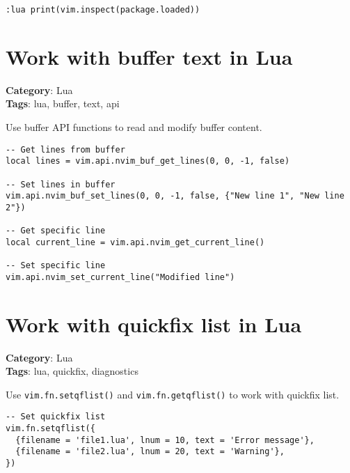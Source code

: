 {{{{{{{\begin{Exa*}{}
\begin{Verbatim}[fontsize=\footnotesize, breaklines, breakanywhere]
:lua print(vim.inspect(package.loaded))
\end{Verbatim}
\end{Exa*}

\section{Work with buffer text in Lua}

\textbf{Category}: Lua\\ \textbf{Tags}: lua, buffer, text, api
\vspace{0.5cm}

Use buffer API functions to read and modify buffer content.

\begin{Exa*}{}
\begin{Verbatim}[fontsize=\footnotesize, breaklines, breakanywhere]
-- Get lines from buffer
local lines = vim.api.nvim_buf_get_lines(0, 0, -1, false)

-- Set lines in buffer
vim.api.nvim_buf_set_lines(0, 0, -1, false, {"New line 1", "New line 2"})

-- Get specific line
local current_line = vim.api.nvim_get_current_line()

-- Set specific line
vim.api.nvim_set_current_line("Modified line")
\end{Verbatim}
\end{Exa*}

\section{Work with quickfix list in Lua}

\textbf{Category}: Lua\\ \textbf{Tags}: lua, quickfix, diagnostics
\vspace{0.5cm}

Use {\footnotesize \Verb§vim.fn.setqflist()§} and {\footnotesize \Verb§vim.fn.getqflist()§} to work with quickfix list.

\begin{Exa*}{}
\begin{Verbatim}[fontsize=\footnotesize, breaklines, breakanywhere]
-- Set quickfix list
vim.fn.setqflist({
  {filename = 'file1.lua', lnum = 10, text = 'Error message'},
  {filename = 'file2.lua', lnum = 20, text = 'Warning'},
})


\end{Verbatim}
\end{Exa*}}}}}}}}
